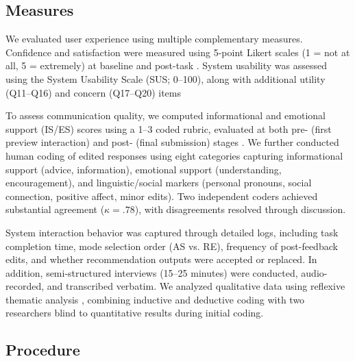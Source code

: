 \documentclass[]{llncs}
\begin{document}
\subsection{Measures}

We evaluated user experience using multiple complementary measures. Confidence and satisfaction were measured using 5-point Likert scales (1 = not at all, 5 = extremely) at baseline and post-task \cite{koo2025likert}. System usability was assessed using the System Usability Scale (SUS; 0--100), along with additional utility (Q11--Q16) and concern (Q17--Q20) items \cite{brooke1996sus}

To assess communication quality, we computed informational and emotional support (IS/ES) scores using a 1--3 coded rubric, evaluated at both pre- (first preview interaction) and post- (final submission) stages \cite{sharma2018mental,pruksachatkun2019moments}. We further conducted human coding of edited responses using eight categories capturing informational support (advice, information), emotional support (understanding, encouragement), and linguistic/social markers (personal pronouns, social connection, positive affect, minor edits). Two independent coders achieved substantial agreement ($\kappa = .78$), with disagreements resolved through discussion.

System interaction behavior was captured through detailed logs, including task completion time, mode selection order (AS vs. RE), frequency of post-feedback edits, and whether recommendation outputs were accepted or replaced. In addition, semi-structured interviews (15--25 minutes) were conducted, audio-recorded, and transcribed verbatim. We analyzed qualitative data using reflexive thematic analysis \cite{braun2006thematic}, combining inductive and deductive coding with two researchers blind to quantitative results during initial coding.


\subsection{Procedure}
\end{document}
